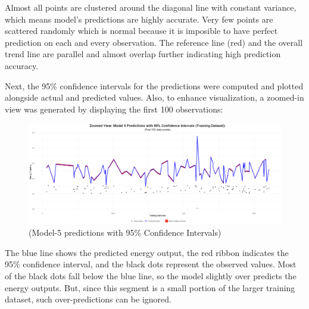 \documentclass[12pt,a4paper]{article}
\begin{document}

Almost all points are clustered around the diagonal line with constant 
variance, which means model’s predictions 
are highly accurate. Very few points are scattered randomly which is normal because it is imposible to
have perfect prediction on each and every observation. The reference line (red) and the overall trend line
are parallel and almost overlap further indicating high prediction accuracy. 



Next, the 95\% confidence intervals for the predictions were 
computed and plotted alongside actual and predicted values. 
Also, to enhance visualization, a zoomed-in view was generated by 
displaying the first 100 observations: 

\begin{figure}[H]
  \centering
  \includegraphics[width=\textwidth]{y18.png}
  \caption{(Model-5 predictions with 95\% Confidence Intervals)}
  \label{fig:Confidence Intervals}
\end{figure}

The blue line shows the predicted energy output, the red 
ribbon indicates the 95\% confidence interval, and the black 
dots represent the observed values. Most of the black 
dots fall below the blue line, so the model 
slightly over predicts the energy outputs. 
But, since this segment is a small portion of the larger  
training dataset, such over-predictions can be ignored.
\end{document}
